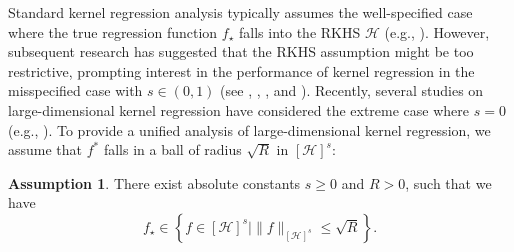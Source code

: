 \documentclass{article}
\theoremstyle{plain}
\theoremstyle{definition}
\newtheorem{assumption}{Assumption} %
\theoremstyle{remark}
\newcommand{\calB}{\mathcal{B}}
\newcommand{\calH}{\mathcal{H}}
\newcommand{\dhmargin}[2]{{\color{cyan}#1}\marginpar{\color{red}\raggedright\footnotesize [DH]:#2}}%
\begin{document}


Standard kernel regression analysis typically assumes the well-specified case where the true regression function $f_{\star}$ falls into the RKHS $\calH$ (e.g., \cite{Caponnetto2006OptimalRF, caponnetto2007optimal, Yao2007OnES, raskutti2014early, Liang_Just_2019, lu2023optimal}). 
However, subsequent research has suggested that the RKHS assumption might be too restrictive, prompting interest in the performance of kernel regression in the misspecified case with $s \in (0, 1)$ (see \citet{fischer2020_SobolevNorm}, \citet{zhang2023optimality,zhang2023optimality_2}, \citet{zhang2024optimal}, and \citet{lu2024pinsker,lu2024saturation}). 
Recently, several studies on large-dimensional kernel regression have considered the extreme case where $s=0$ (e.g., \cite{ghorbani2021linearized, mei2021learning, mei2022generalization, misiakiewicz_learning_2021}).
To provide a unified analysis of large-dimensional kernel regression, 
we assume that $f^*$ falls in a ball of radius $\sqrt{R}$ in $[\calH]^{s}$:
\begin{assumption}\label{assump_function_calss}
There exist absolute constants $s \geq 0$ and $R>0$, such that we have
    \begin{equation}\label{eqn:function_calss}
    f_{\star} \in 
    \left\{f \in [\calH]^{s} \mid \|f\|_{[\calH]^{s}} \leq \sqrt{R}\right\}.
\end{equation}
\end{assumption}

\end{document}
